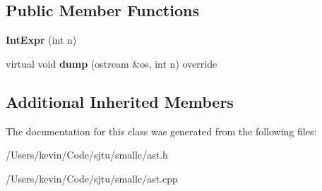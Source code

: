 \subsection*{Public Member Functions}
\begin{DoxyCompactItemize}
\item 
\mbox{\label{class_int_expr_a0933883d5593409f38db273c27f21214}} 
{\bfseries Int\+Expr} (int n)
\item 
\mbox{\label{class_int_expr_ad525807d1a1f843a548eda154135e136}} 
virtual void {\bfseries dump} (ostream \&os, int n) override
\end{DoxyCompactItemize}
\subsection*{Additional Inherited Members}


The documentation for this class was generated from the following files\+:\begin{DoxyCompactItemize}
\item 
/\+Users/kevin/\+Code/sjtu/smallc/ast.\+h\item 
/\+Users/kevin/\+Code/sjtu/smallc/ast.\+cpp\end{DoxyCompactItemize}
